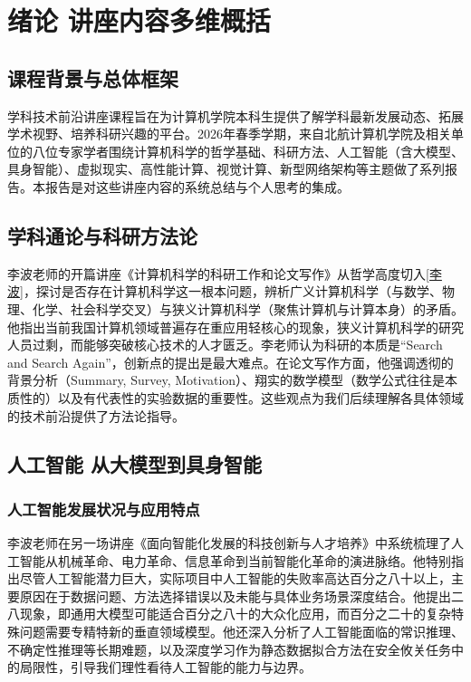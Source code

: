 \chapter{绪论 讲座内容多维概括}

\section{课程背景与总体框架}

学科技术前沿讲座课程旨在为计算机学院本科生提供了解学科最新发展动态、拓展学术视野、培养科研兴趣的平台。2026年春季学期，来自北航计算机学院及相关单位的八位专家学者围绕计算机科学的哲学基础、科研方法、人工智能（含大模型、具身智能）、虚拟现实、高性能计算、视觉计算、新型网络架构等主题做了系列报告。本报告是对这些讲座内容的系统总结与个人思考的集成\cite{li2026ai}。

\section{学科通论与科研方法论}

李波老师的开篇讲座《计算机科学的科研工作和论文写作》从哲学高度切入\ref{李波}，探讨是否存在计算机科学这一根本问题，辨析广义计算机科学（与数学、物理、化学、社会科学交叉）与狭义计算机科学（聚焦计算机与计算本身）的矛盾。他指出当前我国计算机领域普遍存在重应用轻核心的现象，狭义计算机科学的研究人员过剩，而能够突破核心技术的人才匮乏。李老师认为科研的本质是“Search and Search Again”，创新点的提出是最大难点。在论文写作方面，他强调透彻的背景分析（Summary, Survey, Motivation）、翔实的数学模型（数学公式往往是本质性的）以及有代表性的实验数据的重要性。这些观点为我们后续理解各具体领域的技术前沿提供了方法论指导。

\section{人工智能 从大模型到具身智能}

\subsection{人工智能发展状况与应用特点}

李波老师在另一场讲座《面向智能化发展的科技创新与人才培养》中系统梳理了人工智能从机械革命、电力革命、信息革命到当前智能化革命的演进脉络。他特别指出尽管人工智能潜力巨大，实际项目中人工智能的失败率高达百分之八十以上，主要原因在于数据问题、方法选择错误以及未能与具体业务场景深度结合。他提出二八现象，即通用大模型可能适合百分之八十的大众化应用，而百分之二十的复杂特殊问题需要专精特新的垂直领域模型。他还深入分析了人工智能面临的常识推理、不确定性推理等长期难题，以及深度学习作为静态数据拟合方法在安全攸关任务中的局限性，引导我们理性看待人工智能的能力与边界。

